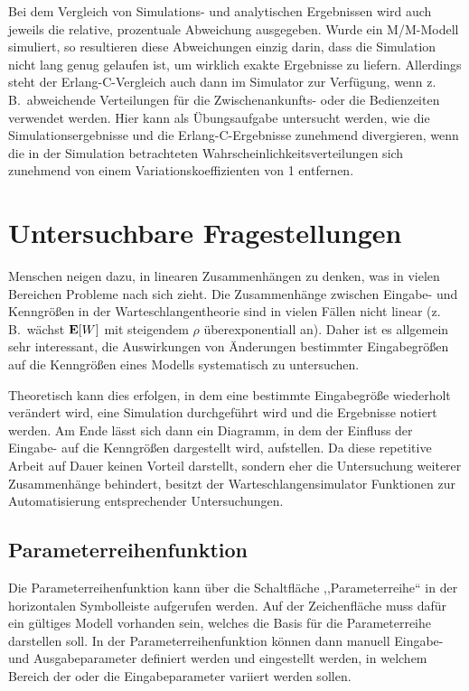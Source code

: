 \documentclass[deutsch]{svmono}
\begin{document}
Bei dem Vergleich von Simulations- und analytischen Ergebnissen wird auch jeweils die relative, prozentuale Abweichung ausgegeben. Wurde ein M/M-Modell simuliert, so resultieren diese Abweichungen einzig darin, dass die Simulation nicht lang genug gelaufen ist, um wirklich exakte Ergebnisse zu liefern. Allerdings steht der Erlang-C-Vergleich auch dann im Simulator zur Verfügung, wenn z.\,B.\ abweichende Verteilungen für die Zwischenankunfts- oder die Bedienzeiten verwendet werden. Hier kann als Übungsaufgabe untersucht werden, wie die Simulationsergebnisse und die Erlang-C-Ergebnisse zunehmend divergieren, wenn die in der Simulation betrachteten Wahrscheinlichkeitsverteilungen sich zunehmend von einem Variationskoeffizienten von 1 entfernen.



\chapter{Untersuchbare Fragestellungen}

Menschen neigen dazu, in linearen Zusammenhängen zu denken, was in vielen Bereichen Probleme nach sich zieht. Die Zusammenhänge zwischen Eingabe- und Kenngrößen in der Warteschlangentheorie sind in vielen Fällen nicht linear (z.\,B.\ wächst ${\bf E}[W]$ mit steigendem $\rho$ überexponentiall an). Daher ist es allgemein sehr interessant, die Auswirkungen von Änderungen bestimmter Eingabegrößen auf die Kenngrößen eines Modells systematisch zu untersuchen.

Theoretisch kann dies erfolgen, in dem eine bestimmte Eingabegröße wiederholt verändert wird, eine Simulation durchgeführt wird und die Ergebnisse notiert werden. Am Ende lässt sich dann ein Diagramm, in dem der Einfluss der Eingabe- auf die Kenngrößen dargestellt wird, aufstellen. Da diese repetitive Arbeit auf Dauer keinen Vorteil darstellt, sondern eher die Untersuchung weiterer Zusammenhänge behindert, besitzt der Warteschlangensimulator Funktionen zur Automatisierung entsprechender Untersuchungen.



\section{Parameterreihenfunktion}

Die Parameterreihenfunktion kann über die Schaltfläche ,,Parameterreihe`` in der horizontalen Symbolleiste aufgerufen werden. Auf der Zeichenfläche muss dafür ein gültiges Modell vorhanden sein, welches die Basis für die Parameterreihe darstellen soll. In der Parameterreihenfunktion können dann manuell Eingabe- und Ausgabeparameter definiert werden und eingestellt werden, in welchem Bereich der oder die Eingabeparameter variiert werden sollen.
\end{document}
